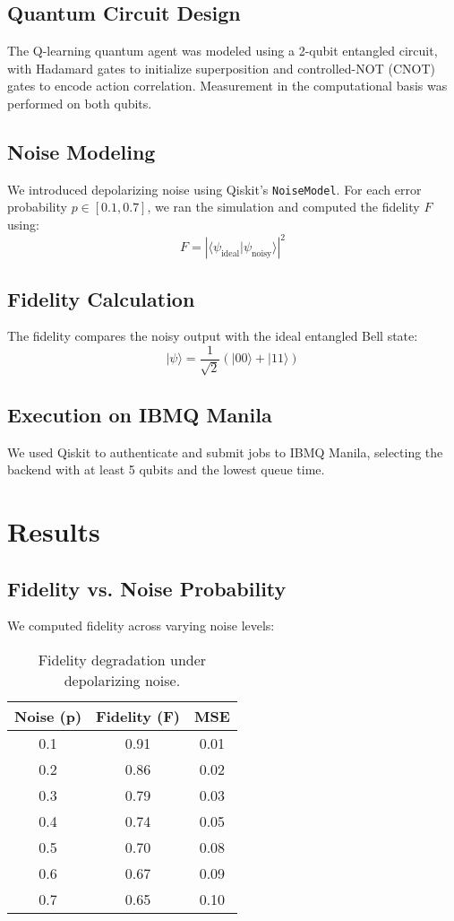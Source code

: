 \documentclass[a4paper,12pt]{article}
\begin{document}
\subsection{Quantum Circuit Design}
The Q-learning quantum agent was modeled using a 2-qubit entangled circuit, with Hadamard gates to initialize superposition and controlled-NOT (CNOT) gates to encode action correlation. Measurement in the computational basis was performed on both qubits.

\subsection{Noise Modeling}
We introduced depolarizing noise using Qiskit's \texttt{NoiseModel}. For each error probability \( p \in [0.1, 0.7] \), we ran the simulation and computed the fidelity \( F \) using:
\[
F = \left| \langle \psi_{\text{ideal}} | \psi_{\text{noisy}} \rangle \right|^2
\]

\subsection{Fidelity Calculation}
The fidelity compares the noisy output with the ideal entangled Bell state:
\[
|\psi\rangle = \frac{1}{\sqrt{2}}(|00\rangle + |11\rangle)
\]

\subsection{Execution on IBMQ Manila}
We used Qiskit to authenticate and submit jobs to IBMQ Manila, selecting the backend with at least 5 qubits and the lowest queue time.

\section{Results}

\subsection{Fidelity vs. Noise Probability}
We computed fidelity across varying noise levels:

\begin{table}[H]
\centering
\begin{tabular}{|c|c|c|}
\hline
\textbf{Noise (p)} & \textbf{Fidelity (F)} & \textbf{MSE} \\
\hline
0.1 & 0.91 & 0.01 \\
0.2 & 0.86 & 0.02 \\
0.3 & 0.79 & 0.03 \\
0.4 & 0.74 & 0.05 \\
0.5 & 0.70 & 0.08 \\
0.6 & 0.67 & 0.09 \\
0.7 & 0.65 & 0.10 \\
\hline
\end{tabular}
\caption{Fidelity degradation under depolarizing noise.}
\end{table}
\end{document}
